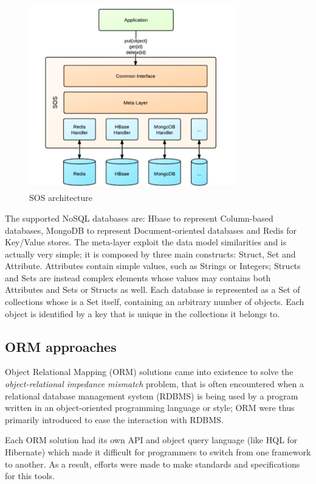 \begin{figure}[tbh]
  \centering
  \includegraphics[width=9cm]{images/sos_architecture}
  \caption{SOS architecture \cite{paper:sos-platform}}
  \label{fig:sos-architecture}
\end{figure}

\noindent The supported NoSQL databases are: Hbase to represent Column-based databases, MongoDB to represent Document-oriented databases and Redis for Key/Value stores. 
\noindent The meta-layer exploit the data model similarities and is actually very simple; it is composed by three main constructs: Struct, Set and Attribute.
Attributes contain simple values, such as Strings or Integers; Structs and Sets are instead complex elements whose values may contains both Attributes and Sets or Structs as well.
Each database is represented as a Set of collections whose is a Set itself, containing an arbitrary number of objects. Each object is identified by a key that is unique in the collections it belongs to.

\subsection{ORM approaches}
Object Relational Mapping (ORM) solutions came into existence to solve the  \textit{object-relational impedance mismatch} problem, that is often encountered when a relational database management system (RDBMS) is being used by a program written in an object-oriented programming language or style; ORM were thus primarily introduced to ease the interaction with RDBMS.

\noindent Each ORM solution had its own API and object query language (like HQL for Hibernate) which made it difficult for programmers to switch from one framework to another. As a result, efforts were made to make standards and specifications for this tools. 

